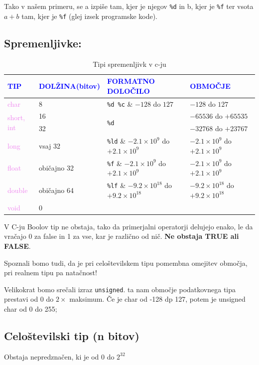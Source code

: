 \documentclass[a4paper, 12pt]{article}
\begin{document}
Tako v našem primeru, se a izpiše tam, kjer je njegov \verb|%d| in b, kjer je \verb|%f| ter vsota $a + b$ tam, kjer je \verb|%f| (glej izsek programske kode).

\subsection{Spremenljivke:}
\begin{table}[!htbp]
	\centering
	\begin{tabular}[b]{|p{3cm}|p{3cm}|p{3cm}|p{4.5cm}|}
		\hline \textcolor{blue}{TIP} & \textcolor{blue}{DOLŽINA(bitov)} & \textcolor{blue}{FORMATNO DOLOČILO} & \textcolor{blue}{OBMOČJE} \\ \hline\hline
		\textcolor{violet}{char} & 8 & \verb|%d %c| & $-128$ do $127$ \\
		\multirow{2}{*}{\textcolor{violet}{short, int}} & 16 & \multirow{2}{*}{\texttt{\%d}} & $-65536$ do $+65535$ \\
		& 32 && $-32768$ do $+23767$ \\
		\textcolor{violet}{long} & vsaj 32 & \verb|%ld| & $-2.1\times10^9$ do $+2.1\times10^9$\\
		\textcolor{violet}{float} & običajno 32 & \verb|%f| & $-2.1\times10^9$ do $+2.1\times10^9$\\
		\textcolor{violet}{double} & običajno 64 & \verb|%lf| & $-9.2\times10^{18}$ do $+9.2\times10^{18}$ \\
		\textcolor{violet}{void} & 0 & & \\ \hline
	\end{tabular}
	\caption{Tipi spremenljivk v c-ju}
\end{table}
%
V C-ju Boolov tip ne obstaja, tako da primerjalni operatorji delujejo enako, le da vračajo 0 za false in 1 za vse, kar je različno od nič. \textbf{Ne obstaja TRUE ali FALSE}.\

Spoznali bomo tudi, da je pri celoštevilskem tipu pomembna omejitev območja, pri realnem tipu pa natačnost!

Velikokrat bomo srečali izraz \lstinline|unsigned|. ta nam območje podatkovnega tipa prestavi od 0 do $2\times$ maksimum. Če je char od -128 dp 127, potem je unsigned char od 0 do 255;

\subsection{Celoštevilski tip (n bitov)}
Obstaja nepredznačen, ki je od 0 do $2^{32}$
\end{document}
